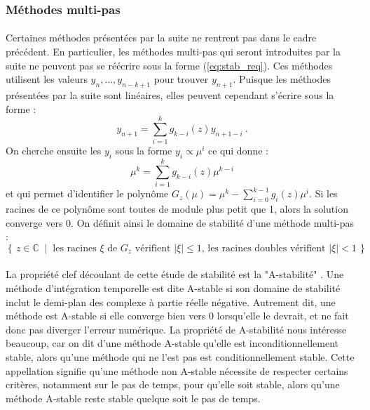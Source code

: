     \subsubsection{Méthodes multi-pas}

      \paragraph{}
      Certaines méthodes présentées par la suite ne rentrent pas dans le cadre précédent.
      En particulier, les méthodes multi-pas qui seront introduites par la suite ne peuvent pas se réécrire sous la forme (\ref{eq:stab_req}).
      Ces méthodes utilisent les valeurs $y_n, \dots, y_{n-k+1}$ pour trouver $y_{n+1}$.
      Puisque les méthodes présentées par la suite sont linéaires, elles peuvent cependant s'écrire sous la forme :
      \[y_{n+1} = \sum_{i=1}^kg_{k-i}\left(z\right)y_{n+1-i}\ .\]
      On cherche ensuite les $y_i$ sous la forme $y_i\propto\mu^{i}$ ce qui donne :
      \[\mu^k = \sum_{i=1}^kg_{k-i}\left(z\right)\mu^{k-i}\]
      et qui permet d'identifier le polynôme $G_z\left(\mu\right) = \mu^k - \sum_{i=0}^{k-1}g_i\left(z\right)\mu^i$.
      Si les racines de ce polynôme sont toutes de module plus petit que 1, alors la solution converge vers 0.
      On définit ainsi le domaine de stabilité d'une méthode multi-pas \cite{HairerWanner1996} :
      \[\left\{\,z\in\mathbb{C}\;\mid\;\textrm{les racines $\xi$ de $G_z$ vérifient $\left|\xi\right| \leq 1$, les racines doubles vérifient $\left|\xi\right| < 1$}\,\right\}\ .\]


    \paragraph{}
    La propriété clef découlant de cette étude de stabilité est la "A-stabilité" \cite{Dahlquist1963}.
    Une méthode d'intégration temporelle est dite A-stable si son domaine de stabilité inclut le demi-plan des complexe à partie réelle négative.
    Autrement dit, une méthode est A-stable si elle converge bien vers 0 lorsqu'elle le devrait, et ne fait donc pas diverger l'erreur numérique.
    La propriété de A-stabilité nous intéresse beaucoup, car on dit d'une méthode A-stable qu'elle est inconditionnellement stable, alors qu'une méthode qui ne l'est pas est conditionnellement stable.
    Cette appellation signifie qu'une méthode non A-stable nécessite de respecter certains critères, notamment sur le pas de temps, pour qu'elle soit stable, alors qu'une méthode A-stable reste stable quelque soit le pas de temps.


